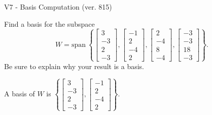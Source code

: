\begin{exercise}
  \begin{exerciseTitle}V7 - Basis Computation (ver. 815)\end{exerciseTitle}
  \begin{exerciseStatement}
    Find a basis for the subspace 
\[W=\mathrm{span}\ \left\{\left[\begin{array}{r}
3 \\
-3 \\
2 \\
-3
\end{array}\right] , \left[\begin{array}{r}
-1 \\
2 \\
-4 \\
2
\end{array}\right] , \left[\begin{array}{r}
2 \\
-4 \\
8 \\
-4
\end{array}\right] , \left[\begin{array}{r}
-3 \\
-3 \\
18 \\
-3
\end{array}\right]\right\}.\]
 Be sure to explain why your result is a basis.


  \end{exerciseStatement}
  \begin{exerciseAnswer}
   A basis of \(W\) is  \(\left\{\left[\begin{array}{r}
3 \\
-3 \\
2 \\
-3
\end{array}\right] , \left[\begin{array}{r}
-1 \\
2 \\
-4 \\
2
\end{array}\right]\right\}\).
  


  \end{exerciseAnswer}
\end{exercise}